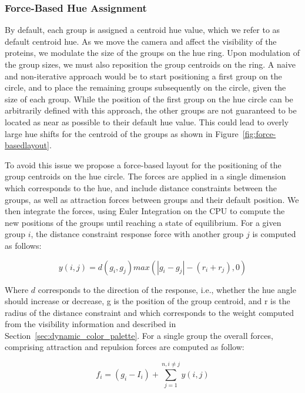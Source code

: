 \documentclass[review,journal]{vgtc}         %
\begin{document}
	\subsubsection{Force-Based Hue Assignment}
	
	By default, each group is assigned a centroid hue value, which we refer to as default centroid hue.
	As we move the camera and affect the visibility of the proteins, we modulate the size of the groups on the hue ring.
	Upon modulation of the group sizes, we must also reposition the group centroids on the ring.
	A naive and non-iterative approach would be to start positioning a first group on the circle, and to place the remaining groups subsequently on the circle, given the size of each group.
	While the position of the first group on the hue circle can be arbitrarily defined with this approach, the other groups are not guaranteed to be located as near as possible to their default hue value.
	This could lead to overly large hue shifts for the centroid of the groups as shown in Figure~\ref{fig:force-basedlayout}.
	
	To avoid this issue we propose a force-based layout for the positioning of the group centroids on the hue circle.
	The forces are applied in a single dimension which corresponds to the hue, and include distance constraints between the groups, as well as attraction forces between groups and their default position.
	We then integrate the forces, using Euler Integration on the CPU to compute the new positions of the groups until reaching a state of equilibrium.
	For a given group $i$, the distance constraint response force with another group $j$ is computed as follows:
	
	\begin{equation}
	y(i, j) = d(g_{i},g_{j})max(|g_{i} - g_{j}| - (r_{i}+r_{j}), 0)
	\end{equation}
	
	Where $d$ corresponds to the direction of the response, i.e., whether the hue angle should increase or decrease, g is the position of the group centroid, and r is the radius of the distance constraint and which corresponds to the weight computed from the visibility information and described in Section~\ref{sec:dynamic_color_palette}.
	For a single group the overall forces, comprising attraction and repulsion forces are computed as follow:
	
	\begin{equation}
	f_{i} = (g_{i} - I_{i}) + \sum_{j=1}^{n, i \neq j} y(i,j)
	\end{equation}
	
\end{document}
